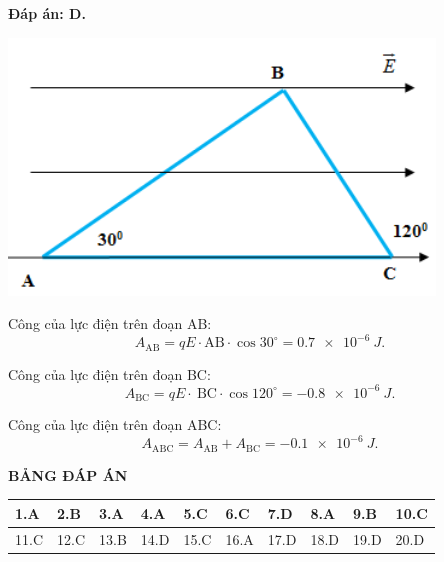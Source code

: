 \begin{enumerate}[label=\bfseries Câu \arabic*:]
{	}
	\loigiai
	{	\textbf{Đáp án: D.}
		
		\begin{center}
			\includegraphics{../figs/VN11-2021-PH-TP005-2}
		\end{center}
	
	Công của lực điện trên đoạn AB:
	$$A_\text{AB} = qE \cdot \text{AB} \cdot \cos 30^\circ = \SI{0.7e-6}{J}.$$
	
	Công của lực điện trên đoạn BC:
	$$A_\text{BC} = qE \cdot\ \text{BC} \cdot \cos 120^\circ = \SI{-0.8e-6}{J}.$$
	
	Công của lực điện trên đoạn ABC:
	$$A_\text{ABC} = A_\text{AB} + A_\text{BC} = \SI{-0.1e-6}{J}.$$
	}
\end{enumerate}

\whiteBGstarEnd

\loigiai
{
	\begin{center}
		\textbf{BẢNG ĐÁP ÁN}
	\end{center}
	\begin{center}
		\begin{tabular}{|m{2.8em}|m{2.8em}|m{2.8em}|m{2.8em}|m{2.8em}|m{2.8em}|m{2.8em}|m{2.8em}|m{2.8em}|m{2.8em}|}
			\hline
			1.A  & 2.B  & 3.A  & 4.A  & 5.C  & 6.C  & 7.D  & 8.A  & 9.B  & 10.C  \\
			\hline
			11.C  & 12.C  & 13.B  & 14.D  & 15.C  & 16.A  & 17.D  & 18.D  & 19.D  & 20.D  \\
			\hline
		\end{tabular}
	\end{center}
}
